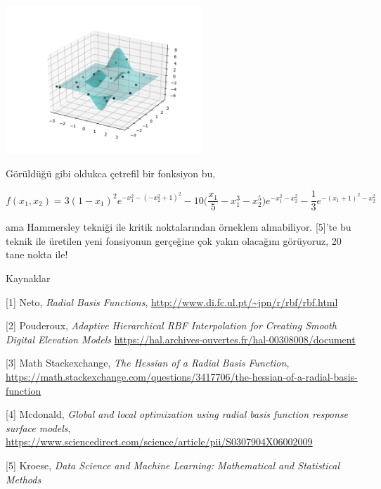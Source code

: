 \documentclass[12pt,fleqn]{article}\usepackage{../../common}
\begin{document}
\includegraphics[width=20em]{linear_app88rbf_07.png}

Görüldüğü gibi oldukca çetrefil bir fonksiyon bu, 

$$
f(x_1,x_2) = 3 (1 - x_1)^2 e^{-x_1^2-(-x_2^2 + 1)^2} - 
10 \bigg( \frac{x_1}{5} - x_1^3-x_2^5 \bigg) e^{-x_1^2 -x_2^2} - 
\frac{1}{3} e^{-(x_1 + 1)^2 - x_2^2}
$$

ama Hammersley tekniği ile kritik noktalarından örneklem
alınabiliyor. [5]'te bu teknik ile üretilen yeni fonsiyonun gerçeğine çok
yakın olacağını görüyoruz, 20 tane nokta ile!


Kaynaklar

[1] Neto, {\em Radial Basis Functions}, \url{http://www.di.fc.ul.pt/~jpn/r/rbf/rbf.html}

[2] Pouderoux, {\em Adaptive Hierarchical RBF Interpolation for Creating Smooth Digital Elevation Models}
    \url{https://hal.archives-ouvertes.fr/hal-00308008/document}    

[3] Math Stackexchange, {\em The Hessian of a Radial Basis Function}, 
    \url{https://math.stackexchange.com/questions/3417706/the-hessian-of-a-radial-basis-function}

[4] Mcdonald, {\em Global and local optimization using radial basis function response surface models}, 
    \url{https://www.sciencedirect.com/science/article/pii/S0307904X06002009}

[5] Kroese, {\em Data Science and Machine Learning: Mathematical and Statistical Methods}
\end{document}
